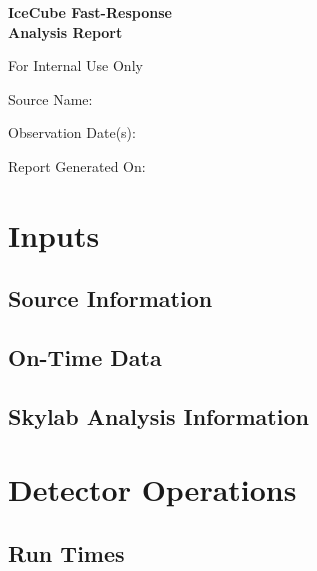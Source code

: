 \documentclass[titlepage]{article}
\begin{document}
\begin{titlepage}
  \centering
  \vspace{4cm}
  {\huge\bfseries IceCube Fast-Response \\ Analysis Report\par}
  \vspace{1cm}
  {\LARGE For Internal Use Only\par}
  \vfill
  {\Large Source Name: \\ \itshape\sourcename\par}
  \vspace{0.5cm}
  {\Large Observation Date(s):\\ \obsdate \par}
  \vfill
  \vspace{1cm} 
  {\Large Report Generated On:\\ \reportdate \par}
\end{titlepage}

\section{Inputs}
\subsection{Source Information}
\sourcetable
\subsection{On-Time Data}
\ontimetable
\subsection{Skylab Analysis Information}
\skylabtable 

\pagebreak
\section{Detector Operations}

\subsection{Run Times}
\runtimetable
\end{document}
